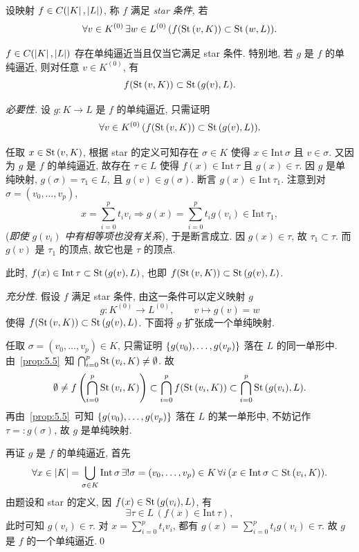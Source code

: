 \begin{Definition}[Star 条件]
	设映射 $ f\in C(\left| K \right| ,\left| L \right| ) $, 称 $ f $ 满足 \emph{star 条件}, 若
	\[
		\forall v\in K^{(0)}\,\exists w\in L^{(0)}\,(f(\mathrm{St}\,(v,K))\subset\mathrm{St}\,(w,L)).
	\]
\end{Definition}

\begin{Proposition}
	$ f\in C(\left| K \right| ,\left| L \right| ) $ 存在单纯逼近当且仅当它满足 star 条件. 特别地, 若 $ g $ 是 $ f $ 的单纯逼近, 则对任意 $ v\in K^{(0)} $, 有
	\[
		f(\mathrm{St}\,(v,K))\subset\mathrm{St}\,(g(v),L).
	\]
\end{Proposition}
\begin{Proof}
	\textit{必要性.} 设 $ g : K\to L $ 是 $ f $ 的单纯逼近, 只需证明
	\[
		\forall v\in K^{(0)}\,(f(\mathrm{St}\,(v,K))\subset\mathrm{St}\,(g(v),L)).
	\]
	
	任取 $ x\in\mathrm{St}\,(v,K) $, 根据 star 的定义可知存在 $ \sigma\in K $ 使得 $ x\in\mathrm{Int}\,\sigma $ 且 $ v\in\sigma $. 又因为 $ g $ 是 $ f $ 的单纯逼近, 故存在 $ \tau\in L $ 使得 $ f(x)\in\mathrm{Int}\,\tau $ 且 $ g(x)\in\tau $. 因 $ g $ 是单纯映射, $ g(\sigma)=\tau_1\in L $, 且 $ g(v)\in g(\sigma) $. 断言 $ g(x)\in\mathrm{Int}\,\tau_1 $. 注意到对 $ \sigma=(v_0,\dots,v_p) $,
	\[
		x=\sum_{i=0}^pt_iv_i\Longrightarrow g(x)=\sum_{i=0}^pt_ig(v_i)\in\mathrm{Int}\,\tau_1,
	\]
	(\textit{即使 $ g(v_i) $ 中有相等项也没有关系}), 于是断言成立. 因 $ g(x)\in\tau $, 故 $ \tau_1\subset\tau $. 而 $ g(v) $ 是 $ \tau_1 $ 的顶点, 故它也是 $ \tau $ 的顶点.

	此时, $ f(x)\in\mathrm{Int}\,\tau\subset\mathrm{St}\,(g(v),L) $, 也即 $ f(\mathrm{St}\,(v,K))\subset\mathrm{St}\,(g(v),L) $.

	\textit{充分性.} 假设 $ f $ 满足 star 条件, 由这一条件可以定义映射 $ g $
	\[
		g : K^{(0)}\to L^{(0)},\qquad v\mapsto g(v)=w
	\]
	使得 $ f(\mathrm{St}\,(v,K))\subset\mathrm{St}\,(g(v),L) $. 下面将 $ g $ 扩张成一个单纯映射.

	任取 $ \sigma=(v_0,\dots,v_p)\in K $, 只需证明 $ \left\{ g(v_0),\dots,g(v_p) \right\} $ 落在 $ L $ 的同一单形中. 由~\ref{prop:5.5}~知 $ \bigcap_{i=0}^p\mathrm{St}\,(v_i,K)\ne\emptyset $. 故
	\[
		\emptyset\ne f\left( \bigcap_{i=0}^p\mathrm{St}\,(v_i,K) \right)\subset\bigcap_{i=0}^pf(\mathrm{St}\,(v_i,K))\subset\bigcap_{i=0}^p\mathrm{St}\,(g(v_i),L).
	\]
	再由~\ref{prop:5.5}~可知 $ \left\{ g(v_0),\dots,g(v_p) \right\} $ 落在 $ L $ 的某一单形中, 不妨记作 $ \tau=:g(\sigma) $, 故 $ g $ 是单纯映射.

	再证 $ g $ 是 $ f $ 的单纯逼近, 首先
	\[
		\forall x\in\left| K \right| =\bigcup_{\sigma\in K}\mathrm{Int}\,\sigma\,\exists!\sigma=(v_0,\dots,v_p)\in K\,\forall i\,(x\in\mathrm{Int}\,\sigma\subset\mathrm{St}\,(v_i,K)).
	\]
	由题设和 star 的定义, 因 $ f(x)\in\mathrm{St}\,(g(v_i),L) $, 有
	\[
		\exists\tau\in L\,(f(x)\in\mathrm{Int}\,\tau),
	\]
	此时可知 $ g(v_i)\in\tau $. 对 $ x=\sum_{i=0}^pt_iv_i $, 都有 $ g(x)=\sum_{i=0}^pt_ig(v_i)\in\tau $. 故 $ g $ 是 $ f $ 的一个单纯逼近.\qed
\end{Proof}


